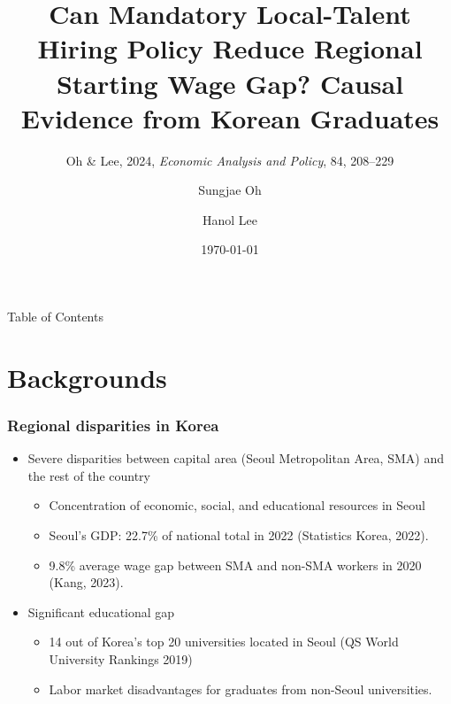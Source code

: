 \documentclass[aspectratio=169,xcolor=dvipsnames,handout]{beamer}
\title{Can Mandatory Local-Talent Hiring Policy Reduce Regional Starting Wage Gap? Causal Evidence from Korean Graduates}
\subtitle{Oh \& Lee, 2024, \textit{Economic Analysis and Policy}, 84, 208–229}
\author[Oh \& Lee]{Sungjae Oh\inst{1} \and Hanol Lee\inst{2}}
\institute[CNU / SUFE]
{%
  \inst{1}
  Chungnam National University, Korea\\
  \vspace{0.2cm}
  \inst{2}
  Southwestern University of Finance and Economics, China\\
  \vspace{0.4cm}
  Presented at Korea Institute for Health and Social Affairs
}
\date[Nov, 2024]{\today}
\begin{document}

\frame{\titlepage}

\begin{frame}{Table of Contents}
    \small
    \tableofcontents[hideallsubsections]
\end{frame}

\section{Backgrounds}
\begin{frame}
    \frametitle{Regional disparities in Korea}
    \begin{itemize}[<+->]
        \item Severe disparities between capital area (Seoul Metropolitan Area, SMA) and the rest of the country
        \begin{itemize}[<+->]
            \item Concentration of economic, social, and educational resources in Seoul
            \item Seoul's GDP\@: 22.7\% of national total in 2022 (Statistics Korea, 2022).
            \item 9.8\% average wage gap between SMA and non-SMA workers in 2020 (Kang, 2023).
        \end{itemize}
        \item Significant educational gap
        \begin{itemize}[<+->]
            \item 14 out of Korea's top 20 universities located in Seoul (QS World University Rankings 2019)
            \item Labor market disadvantages for graduates from non-Seoul universities.
        \end{itemize}
    \end{itemize}
\end{frame}
\end{document}
